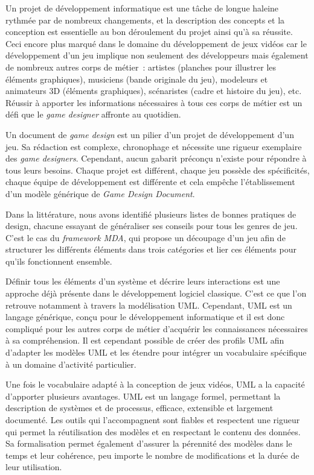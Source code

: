 \begin{conclusion}

Un projet de développement informatique est une tâche de longue haleine rythmée par de nombreux changements,
et
la description des concepts et la conception est essentielle au bon déroulement du projet ainsi qu'à sa réussite.
%
Ceci encore plus marqué dans le domaine du développement de jeux vidéos car
le développement d'un jeu implique non seulement des développeurs mais également de nombreux autres corps de métier~: artistes (planches pour illustrer les éléments graphiques),  musiciens (bande originale du jeu), modeleurs et animateurs 3D (éléments graphiques), scénaristes (cadre et histoire du jeu), etc.
Réussir à apporter les informations nécessaires à tous ces corps de métier est un défi que le \emph{game designer} affronte au quotidien.

Un document de \emph{game design} est un pilier d'un projet de développement d'un jeu.
Sa rédaction est complexe, chronophage et nécessite une rigueur exemplaire des \emph{game designers}.
Cependant, aucun gabarit préconçu n'existe pour répondre à tous leurs besoins.
Chaque projet est différent, chaque jeu possède des spécificités, chaque équipe de développement est différente et cela empêche l'établissement d'un modèle générique de \emph{Game Design Document}.

Dans la littérature, nous avons identifié plusieurs listes de bonnes pratiques de design, chacune essayant de généraliser ses conseils pour tous les genres de jeu.
C'est le cas du \emph{framework MDA}, qui propose un découpage d'un jeu afin de structurer les différents éléments dans trois catégories et lier ces éléments pour qu'ils fonctionnent ensemble.

Définir tous les éléments d'un système et décrire leurs interactions est une approche déjà présente dans le développement logiciel classique.
C'est ce que l'on retrouve notamment à travers la modélisation UML.
Cependant, UML est un langage générique, conçu pour le développement informatique et il est donc compliqué pour les autres corps de métier d'acquérir les connaissances nécessaires à sa compréhension.
Il est cependant possible de créer des profils UML afin d'adapter les modèles UML et les étendre pour intégrer un vocabulaire spécifique à un domaine d'activité particulier.

Une fois le vocabulaire adapté à la conception de jeux vidéos, UML a la capacité d'apporter plusieurs avantages.
UML est un langage formel, permettant la description de systèmes et de processus, efficace, extensible et largement documenté.
Les outils qui l'accompagnent sont fiables et respectent une rigueur qui permet la réutilisation des modèles et en respectant le contenu des données.
Sa formalisation permet également d'assurer la pérennité des modèles dans le temps et leur cohérence, peu importe le nombre de modifications et la durée de leur utilisation.


\end{conclusion}
